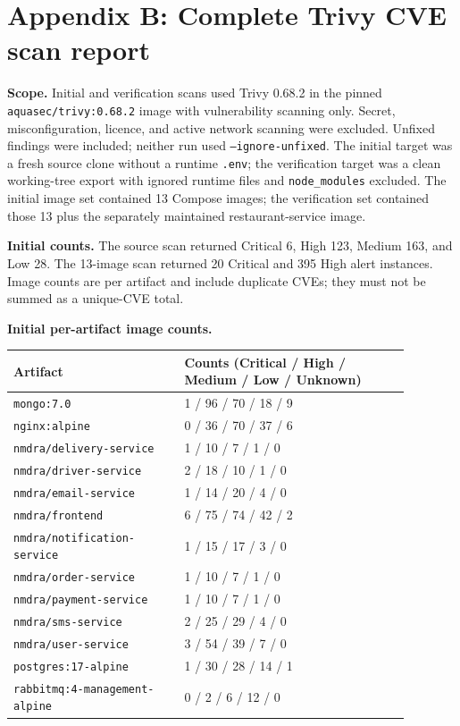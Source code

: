 \documentclass[11pt]{article}
\begin{document}
\section*{Appendix B: Complete Trivy CVE scan report}
\textbf{Scope.} Initial and verification scans used Trivy 0.68.2 in the pinned \texttt{aquasec/trivy:0.68.2} image with vulnerability scanning only. Secret, misconfiguration, licence, and active network scanning were excluded. Unfixed findings were included; neither run used \texttt{--ignore-unfixed}. The initial target was a fresh source clone without a runtime \texttt{.env}; the verification target was a clean working-tree export with ignored runtime files and \texttt{node\_modules} excluded. The initial image set contained 13 Compose images; the verification set contained those 13 plus the separately maintained restaurant-service image.

\textbf{Initial counts.} The source scan returned Critical 6, High 123, Medium 163, and Low 28. The 13-image scan returned 20 Critical and 395 High alert instances. Image counts are per artifact and include duplicate CVEs; they must not be summed as a unique-CVE total.

\textbf{Initial per-artifact image counts.}
\begin{longtable}{P{0.38\linewidth}P{0.50\linewidth}}
\toprule
{}\textbf{Artifact} & \textbf{Counts (Critical / High / Medium / Low / Unknown)} \\
\midrule
\endhead
\texttt{mongo:7.0} & 1 / 96 / 70 / 18 / 9 \\
\texttt{nginx:alpine} & 0 / 36 / 70 / 37 / 6 \\
\texttt{nmdra/delivery-service} & 1 / 10 / 7 / 1 / 0 \\
\texttt{nmdra/driver-service} & 2 / 18 / 10 / 1 / 0 \\
\texttt{nmdra/email-service} & 1 / 14 / 20 / 4 / 0 \\
\texttt{nmdra/frontend} & 6 / 75 / 74 / 42 / 2 \\
\texttt{nmdra/notification-service} & 1 / 15 / 17 / 3 / 0 \\
\texttt{nmdra/order-service} & 1 / 10 / 7 / 1 / 0 \\
\texttt{nmdra/payment-service} & 1 / 10 / 7 / 1 / 0 \\
\texttt{nmdra/sms-service} & 2 / 25 / 29 / 4 / 0 \\
\texttt{nmdra/user-service} & 3 / 54 / 39 / 7 / 0 \\
\texttt{postgres:17-alpine} & 1 / 30 / 28 / 14 / 1 \\
\texttt{rabbitmq:4-management-alpine} & 0 / 2 / 6 / 12 / 0 \\
\bottomrule
\end{longtable}
\end{document}
